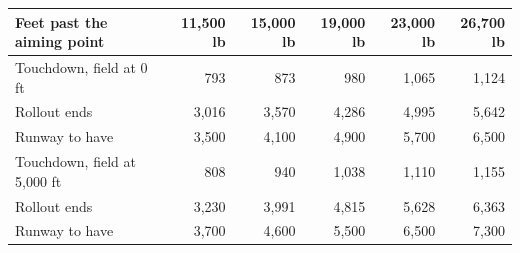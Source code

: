 \begin{tabular}{@{}lrrrrr@{}}
\toprule
Feet past the aiming point & 11,500 lb & 15,000 lb & 19,000 lb & 23,000 lb & 26,700 lb \\
\midrule
Touchdown, field at 0 ft & 793 & 873 & 980 & 1,065 & 1,124 \\
Rollout ends & 3,016 & 3,570 & 4,286 & 4,995 & 5,642 \\
Runway to have & 3,500 & 4,100 & 4,900 & 5,700 & 6,500 \\
\addlinespace
Touchdown, field at 5,000 ft & 808 & 940 & 1,038 & 1,110 & 1,155 \\
Rollout ends & 3,230 & 3,991 & 4,815 & 5,628 & 6,363 \\
Runway to have & 3,700 & 4,600 & 5,500 & 6,500 & 7,300 \\
\bottomrule
\end{tabular}

